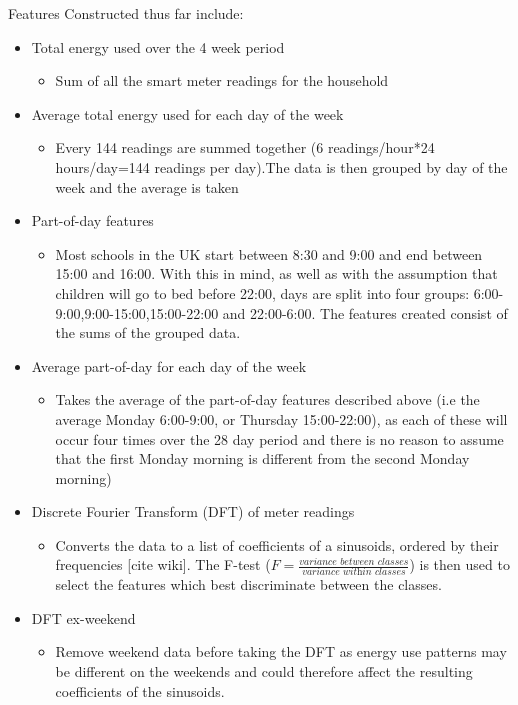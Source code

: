 \documentclass[12pt,a4paper]{article}
\begin{document}
Features Constructed thus far include:
\begin{itemize}
	\item Total energy used over the 4 week period
		\begin{itemize}
			\item{Sum of all the smart meter readings for the household}
		\end{itemize}
	\item Average total energy used for each day of the week
	\begin{itemize}
		\item Every 144 readings are summed together (6 readings/hour*24 hours/day=144 readings per day).The data is then grouped by day of the week and the average is taken
	\end{itemize}
	\item Part-of-day features
		\begin{itemize}
			\item Most schools in the UK start between 8:30 and 9:00 and end between 15:00 and 16:00. With this in mind, as well as with the assumption that children will go to bed before 22:00, days are split into four groups: 6:00-9:00,9:00-15:00,15:00-22:00 and 22:00-6:00. The features created consist of the sums of the grouped data.
		\end{itemize}
	\item Average part-of-day for each day of the week
		\begin{itemize}
			\item Takes the average of the part-of-day features described above (i.e the average Monday 6:00-9:00, or Thursday 15:00-22:00), as each of these will occur four times over the 28 day period and there is no reason to assume that the first Monday morning is different from the second Monday morning)
		\end{itemize}
	\item Discrete Fourier Transform (DFT) of meter readings
		\begin{itemize}
			\item Converts the data to a list of coefficients of a sinusoids, ordered by their frequencies [cite wiki]. The F-test ($F=\frac{\textit{variance between classes}}{\textit{variance within classes}}$) is then used to select the features which best discriminate between the classes. 
		\end{itemize}
	\item DFT ex-weekend
		\begin{itemize}
			\item Remove weekend data before taking the DFT as energy use patterns may be different on the weekends and could therefore affect the resulting coefficients of the sinusoids. 
		\end{itemize}

\end{itemize}
\end{document}
